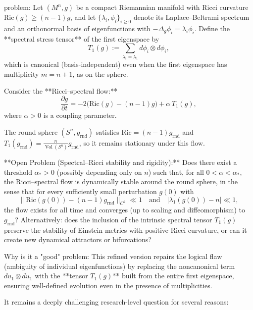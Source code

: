 problem:  
Let \((M^n,g)\) be a compact Riemannian manifold with Ricci curvature \(\mathrm{Ric}(g)\ge (n-1)g\), and let \(\{\lambda_i,\phi_i\}_{i\ge0}\) denote its Laplace–Beltrami spectrum and an orthonormal basis of eigenfunctions with \(-\Delta_g\phi_i=\lambda_i\phi_i\).  
Define the **spectral stress tensor** of the first eigenspace by  
\[
T_1(g):=\sum_{\lambda_i=\lambda_1} d\phi_i\otimes d\phi_i,
\]
which is canonical (basis-independent) even when the first eigenspace has multiplicity \(m=n+1\), as on the sphere.

Consider the **Ricci–spectral flow:**
\[
\frac{\partial g}{\partial t}
  = -2\bigl(\mathrm{Ric}(g) - (n-1)g\bigr) + \alpha\, T_1(g),
\]
where \(\alpha>0\) is a coupling parameter.

The round sphere \((S^n,g_{\mathrm{rnd}})\) satisfies \(\mathrm{Ric}=(n-1)g_{\mathrm{rnd}}\) and \(T_1(g_{\mathrm{rnd}})=\frac{n}{\operatorname{Vol}(S^n)}g_{\mathrm{rnd}}\), so it remains stationary under this flow.

**Open Problem (Spectral–Ricci stability and rigidity):**  
Does there exist a threshold \(\alpha_*>0\) (possibly depending only on \(n\)) such that, for all \(0<\alpha<\alpha_*\), the Ricci–spectral flow is dynamically stable around the round sphere, in the sense that for every sufficiently small perturbation \(g(0)\) with  
\[
\|\mathrm{Ric}(g(0))-(n-1)g_{\mathrm{rnd}}\|_{C^2}\ll1
\quad\text{and}\quad
|\lambda_1(g(0))-n|\ll1,
\]
the flow exists for all time and converges (up to scaling and diffeomorphism) to \(g_{\mathrm{rnd}}\)?  
Alternatively: does the inclusion of the intrinsic spectral tensor \(T_1(g)\) preserve the stability of Einstein metrics with positive Ricci curvature, or can it create new dynamical attractors or bifurcations?

Why is it a "good" problem:  
This refined version repairs the logical flaw (ambiguity of individual eigenfunctions) by replacing the noncanonical term \(du_1\otimes du_1\) with the **tensor \(T_1(g)\)** built from the entire first eigenspace, ensuring well-defined evolution even in the presence of multiplicities.  

It remains a deeply challenging research-level question for several reasons:

